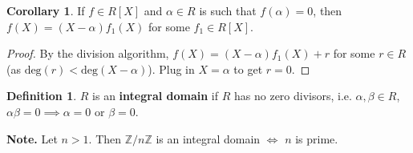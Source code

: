 \documentclass{article}
\theoremstyle{definition}
\newtheorem{cor}[theorem]{Corollary}
\newtheorem{defn}{Definition}[section]
\begin{document}
\begin{cor} %
    If $f \in R[X]$ and $\alpha \in R$ is such that $f(\alpha)=0$, then $f(X) = (X-\alpha)f_1(X)$ for some $f_1 \in R[X]$. 
\end{cor}
\begin{proof}
    By the division algorithm, $f(X) = (X-\alpha) f_1(X) + r$ for some $r \in R$ (as $\text{deg}(r) < \text{deg}(X-\alpha)$). Plug in $X=\alpha$ to get $r=0$.
\end{proof}
\begin{defn}
    $R$ is an \textbf{integral domain} if $R$ has no zero divisors, i.e. $\alpha,\beta \in R$, $\alpha \beta=0 \implies \alpha=0$ or $\beta=0$.
\end{defn}
\textbf{Note.} Let $n>1$. Then $\mathbb{Z}/n\mathbb{Z}$ is an integral domain $\iff$ $n$ is prime.
\end{document}
